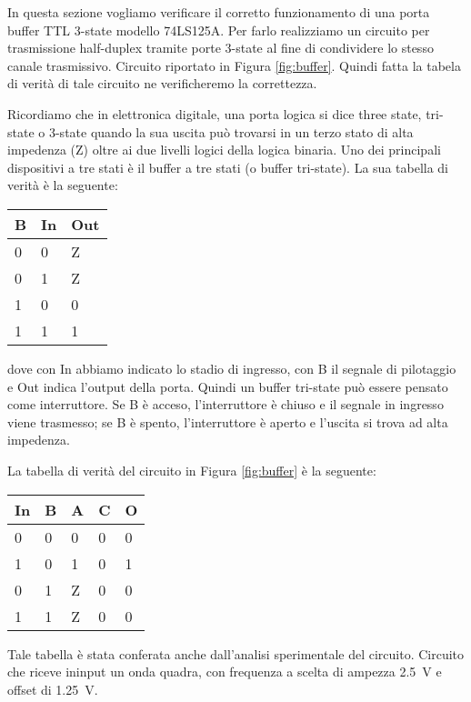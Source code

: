 In questa sezione vogliamo verificare il corretto funzionamento di una porta buffer TTL 3-state modello 74LS125A. Per farlo realizziamo un circuito per trasmissione half-duplex tramite porte 3-state al fine di condividere lo stesso canale trasmissivo. Circuito riportato in Figura \ref{fig:buffer}. Quindi fatta la tabela di verità di tale circuito ne verificheremo la correttezza.

Ricordiamo che in elettronica digitale, una porta logica si dice three state, tri-state o 3-state quando la sua uscita può trovarsi in un terzo stato di alta impedenza (Z) oltre ai due livelli logici della logica binaria.
Uno dei principali dispositivi a tre stati è il buffer a tre stati (o buffer tri-state). La sua tabella di verità è la seguente:

\begin{center}
	\begin{tabular}{lll}
	\toprule
		B & In & Out\\
	\midrule
		0 & 0 & Z \\
		0 & 1 & Z \\
		1 & 0 & 0 \\
		1 & 1 & 1 \\
	\bottomrule
	\end{tabular}
\end{center}
%
dove con In abbiamo indicato lo stadio di ingresso, con B il segnale di pilotaggio e Out indica l'output della porta.
Quindi un buffer tri-state può essere pensato come interruttore. Se B è acceso, l'interruttore è chiuso e il segnale in ingresso viene trasmesso; se B è spento, l'interruttore è aperto e l'uscita si trova ad alta impedenza.

La tabella di verità del circuito in Figura \ref{fig:buffer} è la seguente:

\begin{center}
	\begin{tabular}{lllll}
	\toprule
		In & B & A & C & O\\
	\midrule
		0 & 0 & 0 & 0 & 0 \\
		1 & 0 & 1 & 0 & 1 \\
		0 & 1 & Z & 0 & 0 \\
		1 & 1 & Z & 0 & 0 \\
	\bottomrule
	\end{tabular}
\end{center}
%
Tale tabella è stata conferata anche dall'analisi sperimentale del circuito. Circuito che riceve ininput un onda quadra, con frequenza a scelta di ampezza \SI{2.5}{\volt} e offset di \SI{1.25}{\volt}. 

